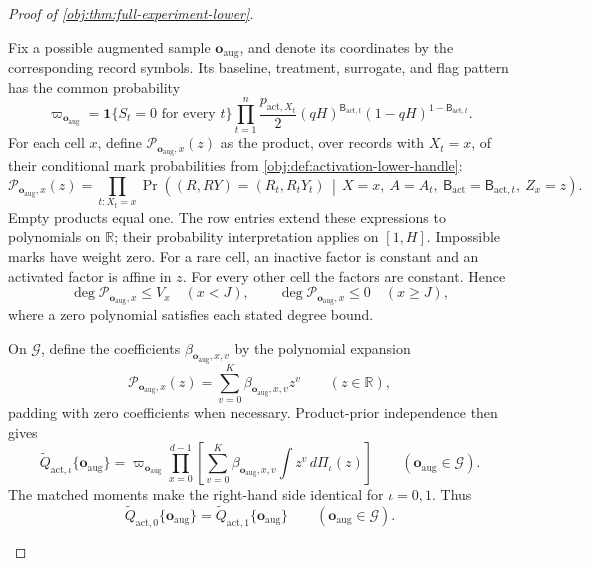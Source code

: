 \documentclass[11pt]{article}
\begin{document}
\begin{proof}[Proof of \cref{obj:thm:full-experiment-lower}]
\begin{enumerate}
Fix a possible augmented sample \(\mathbf o_{\mathrm{aug}}\), and denote its
coordinates by the corresponding record symbols. Its baseline, treatment,
surrogate, and flag pattern has the common probability
\[
\varpi_{\mathbf o_{\mathrm{aug}}}
=
\mathbf1\{S_t=0\text{ for every }t\}
\prod_{t=1}^{n}
\frac{p_{\mathrm{act},X_t}}2
(qH)^{\mathsf B_{\mathrm{act},t}}
(1-qH)^{1-\mathsf B_{\mathrm{act},t}}.
\]
For each cell \(x\), define \(\mathcal P_{\mathbf o_{\mathrm{aug}},x}(z)\)
as the product, over records with \(X_t=x\), of their conditional mark
probabilities from \cref{obj:def:activation-lower-handle}:
\[
\mathcal P_{\mathbf o_{\mathrm{aug}},x}(z)
=
\prod_{t:X_t=x}
\Pr\!\left(
(R,RY)=(R_t,R_tY_t)
\,\middle|\,
X=x,\ A=A_t,\ \mathsf B_{\mathrm{act}}=\mathsf B_{\mathrm{act},t},
\ Z_x=z
\right).
\]
Empty products equal one. The row entries extend these expressions to
polynomials on \(\mathbb R\); their probability interpretation applies on
\([1,H]\). Impossible marks have weight zero. For a rare cell, an inactive
factor is constant and an activated factor is affine in \(z\). For every
other cell the factors are constant. Hence
\[
\deg\mathcal P_{\mathbf o_{\mathrm{aug}},x}\le V_x
\quad(x<J),\qquad
\deg\mathcal P_{\mathbf o_{\mathrm{aug}},x}\le0
\quad(x\ge J),
\]
where a zero polynomial satisfies each stated degree bound.

On \(\mathcal G\), define the coefficients
\(\beta_{\mathbf o_{\mathrm{aug}},x,v}\) by the polynomial expansion
\[
\mathcal P_{\mathbf o_{\mathrm{aug}},x}(z)
=\sum_{v=0}^{K}
\beta_{\mathbf o_{\mathrm{aug}},x,v}z^v
\qquad(z\in\mathbb R),
\]
padding with zero coefficients when necessary. Product-prior independence
then gives
\[
\widetilde Q_{\mathrm{act},\iota}\{\mathbf o_{\mathrm{aug}}\}
=
\varpi_{\mathbf o_{\mathrm{aug}}}
\prod_{x=0}^{d-1}
\left[
\sum_{v=0}^{K}
\beta_{\mathbf o_{\mathrm{aug}},x,v}
\int z^v\,d\Pi_\iota(z)
\right]
\qquad(\mathbf o_{\mathrm{aug}}\in\mathcal G).
\]
The matched moments make the right-hand side identical for
\(\iota=0,1\). Thus
\[
\widetilde Q_{\mathrm{act},0}\{\mathbf o_{\mathrm{aug}}\}
=
\widetilde Q_{\mathrm{act},1}\{\mathbf o_{\mathrm{aug}}\}
\qquad(\mathbf o_{\mathrm{aug}}\in\mathcal G).
\]


\end{enumerate}
\end{proof}
\end{document}
